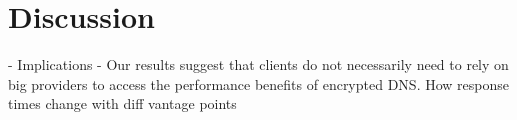 \section{Discussion}\label{sec:discussion}
- Implications
	- Our results suggest that clients do not necessarily need to rely on big providers to access the performance benefits of encrypted DNS. 
How response times change with diff vantage points 
